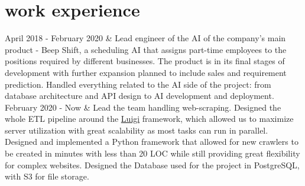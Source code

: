 \documentclass[]{cv-roald}
\begin{document}
\section*{work experience}
\begin{tabularcv}
   April 2018 - February 2020       &   
                    \newline Lead engineer of the AI of the company's main product - Beep Shift, a scheduling AI that assigns part-time employees to the positions required by different businesses. The product is in its final stages of development with further expansion planned to include sales and requirement prediction.
                    \newline Handled everything related to the AI side of the project: from database architecture and API design to AI development and deployment.
                    \\[\vspacepar]
  February 2020 - Now   & 
                    \newline Lead the team handling web-scraping. Designed the whole ETL pipeline around the \href{https://luigi.readthedocs.io/en/stable/}{Luigi} framework, which allowed us to maximize server utilization with great scalability as most tasks can run in parallel.
                    \newline Designed and implemented a Python framework that allowed for new crawlers to be created in minutes with less than 20 LOC while still providing great flexibility for complex websites.
                    \newline Designed the Database used for the project in PostgreSQL, with S3 for file storage.
\end{tabularcv}
\end{document}
